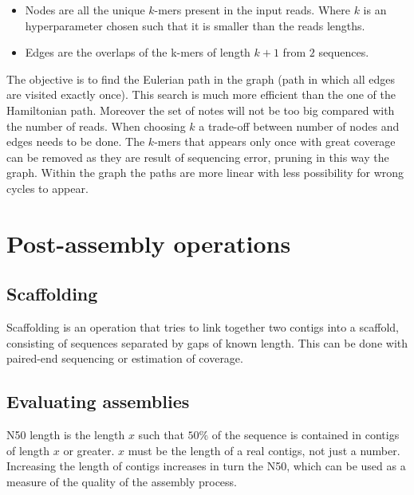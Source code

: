 \begin{multicols}{2}
    \begin{itemize}
        \item Nodes are all the unique $k$-mers present in the input reads.
            Where $k$ is an hyperparameter chosen such that it is smaller than the reads lengths.
        \item Edges are the overlaps of the k-mers of length $k+1$ from $2$ sequences.
    \end{itemize}
\end{multicols}

The objective is to find the Eulerian path in the graph (path in which all edges are visited exactly once).
This search is much more efficient than the one of the Hamiltonian path.
Moreover the set of notes will not be too big compared with the number of reads.
When choosing $k$ a trade-off between number of nodes and edges needs to be done.
The $k$-mers that appears only once with great coverage can be removed as they are result of sequencing error, pruning in this way the graph.
Within the graph the paths are more linear with less possibility for wrong cycles to appear.


\section{Post-assembly operations}

    \subsection{Scaffolding}
    Scaffolding is an operation that tries to link together two contigs into a scaffold, consisting of sequences separated by gaps of known length.
    This can be done with paired-end sequencing or estimation of coverage.

    \subsection{Evaluating assemblies}
    N50 length is the length $x$ such that $50\%$ of the sequence is contained in contigs of length $x$ or greater.
    $x$ must be the length of a real contigs, not just a number.
    Increasing the length of contigs increases in turn the N50, which can be used as a measure of the quality of the assembly process.
